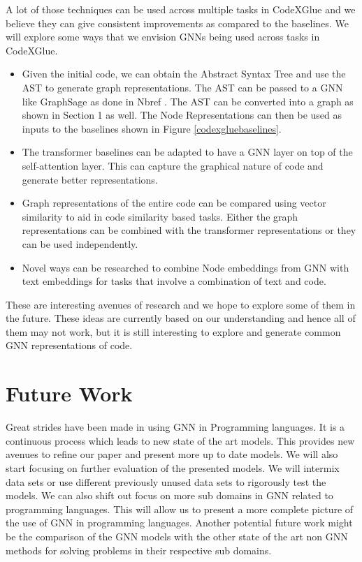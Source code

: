 \documentclass{article}
\begin{document}
A lot of those techniques can be used across multiple tasks in CodeXGlue and we believe they can give consistent improvements as compared to the baselines. We will explore some ways that we envision GNNs being used across tasks in CodeXGlue.

\begin{itemize}
    \item Given the initial code, we can obtain the Abstract Syntax Tree and use the AST to generate graph representations. The AST can be passed to a GNN like GraphSage \cite{hamilton2017inductive} as done in Nbref \cite{nbref}. The AST can be converted into a graph as shown in Section 1 as well. The Node Representations can then be used as inputs to the baselines shown in Figure \ref{codexgluebaselines}.
    \item The transformer baselines can be adapted to have a GNN layer on top of the self-attention layer. This can capture the graphical nature of code and generate better representations.
    \item Graph representations of the entire code can be compared using vector similarity to aid in code similarity based tasks. Either the graph representations can be combined with the transformer representations or they can be used independently.
    \item Novel ways can be researched to combine Node embeddings from GNN with text embeddings for tasks that involve a combination of text and code.
\end{itemize}

These are interesting avenues of research and we hope to explore some of them in the future. These ideas are currently based on our understanding and hence all of them may not work, but it is still interesting to explore and generate common GNN representations of code.

\section{Future Work}
Great strides have been made in using GNN in Programming languages. It is a continuous process which leads to new state of the art models. This provides new avenues to refine our paper and present more up to date models. We will also start focusing on further evaluation of the presented models. We will intermix data sets or use different previously unused data sets to rigorously test the models. We can also shift out focus on more sub domains in GNN related to programming languages. This will allow us to present a more complete picture of the use of GNN in programming languages. Another potential future work might be the comparison of the GNN models with the other state of the art non GNN methods for solving problems in their respective sub domains.
\end{document}
